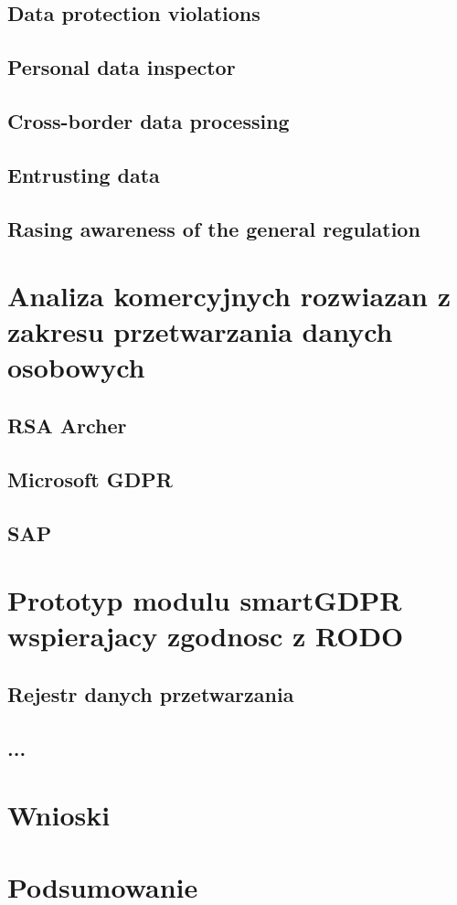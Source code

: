 \documentclass[en, noamssymb]{mgr}
\begin{document}
\section{Data protection violations}
\section{Personal data inspector}
\section{Cross-border data processing}
\section{Entrusting data}
\section{Rasing awareness of the general regulation}

\chapter{Analiza komercyjnych rozwiazan z zakresu przetwarzania danych osobowych} \label{sec:sekcjaAnalizaRozwiazan}
\section{RSA Archer}
\section{Microsoft GDPR}
\section{SAP}

\chapter{Prototyp modulu smartGDPR wspierajacy zgodnosc z RODO} \label{sec:sekcjaOpisPrototypu}
\section{Rejestr danych przetwarzania}
\section{...}

\chapter{Wnioski} \label{sec:sekcjaWnioski}

\chapter{Podsumowanie}
\label{sec:Podsumowanie}

\end{document}
